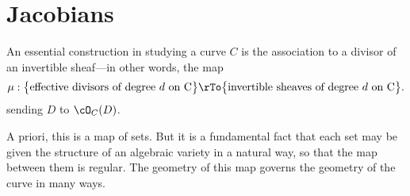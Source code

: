 
%

\chapter{Jacobians}\label{new Jacobians chapter}

%
%
%
%


An essential construction in studying a curve $C$ is the association to a divisor  of an invertible sheaf---in other words, the map
$$
\mu : \big\{ \text{effective divisors of degree $d$ on C}\big\} \rTo \big\{ \text{invertible sheaves of degree $d$ on C} \big\}.
$$
sending $D$ to $\cO_C(D)$.

A priori, this is a map of sets. But it is a fundamental fact that each set may  be given the structure of an algebraic variety in a natural way, so that the map between them is regular. The geometry of this map governs the geometry of the curve in many ways.

